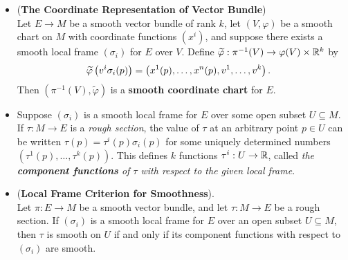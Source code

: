\documentclass[11pt]{article}
\begin{document}
\begin{itemize}
\item \begin{corollary} (\textbf{The Coordinate Representation of Vector Bundle})\\
Let  $E \rightarrow M$  be a smooth vector bundle of rank $k$, let $(V, \varphi)$ be a smooth chart on $M$ with coordinate functions $(x^i)$, and suppose there exists a
smooth local frame $(\sigma_i)$ for $E$ over $V$. Define $\widetilde{\varphi}: \pi^{-1}(V) \rightarrow \varphi(V)  \times {\mathbb R}^k$ by
\begin{align}
\widetilde{\varphi}\left(v^{i} \sigma_i(p)\right) &= \left(x^1(p), \ldots, x^{n}(p), v^1, \ldots, v^{k}\right).   \label{eqn: coordinate_representation_vector_bundle_local_frame}
\end{align} Then $(\pi^{-1}(V), \widetilde{\varphi})$ is a \textbf{smooth coordinate chart} for $E$.
\end{corollary}

\item \begin{definition} 
Suppose  $(\sigma_i)$ is a smooth local frame for $E$ over some open subset $U \subseteq M$. If $\tau: M \rightarrow E$ is a \emph{rough section}, the value of $\tau$ at
an arbitrary point $p \in U$ can be written $\tau(p) = \tau^{i}(p)\sigma_i(p)$ for some uniquely determined numbers $(\tau^1(p), \ldots, \tau^{k}(p))$. This defines $k$ functions $\tau^i: U \rightarrow {\mathbb R}$, called \emph{the \textbf{component functions} of $\tau$ with respect to the given local frame}.
\end{definition}

\item \begin{proposition}  (\textbf{Local Frame Criterion for Smoothness}).\\
Let $\pi: E \rightarrow M$ be a smooth vector bundle, and let $\tau: M \rightarrow E$ be a rough section. If  $(\sigma_i)$ is a smooth local frame for $E$ over an open subset $U \subseteq M$, then $\tau$ is smooth on $U$ if and only if its component functions with respect to $(\sigma_i)$ are smooth.
\end{proposition}
\end{itemize}

\newpage
\end{document}
